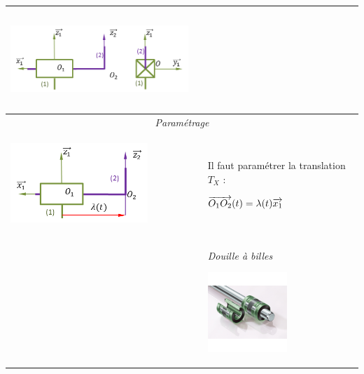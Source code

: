 \documentclass[10pt,oneside]{article}
\begin{document}
\begin{center}
\begin{tabular}{p{} c p{}}
\begin{center}
\includegraphics[height=3cm]{png/glissiere_2d} 
\end{center}\\
\hline
\multicolumn{3}{c}{\textit{Paramétrage}}\\
\begin{center}
\includegraphics[height=3cm]{png/glissiere_p} 
\end{center}& &
Il faut paramétrer la translation $T_X$ :

$\overrightarrow{O_1O_2}(t)=\lambda(t) \overrightarrow{x_1}$
\\
\hline 
&&
\begin{center}
\textit{Douille à billes}

\includegraphics[height=3cm]{png/douille} 
\end{center}\\
\hline 
\end{tabular}
\end{center}

\newpage
\end{document}
